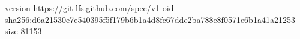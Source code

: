 version https://git-lfs.github.com/spec/v1
oid sha256:d6a21530e7e540395f5f179b6b1a4d8fc67dde2ba788e8f0571e6b1a41a21253
size 81153
